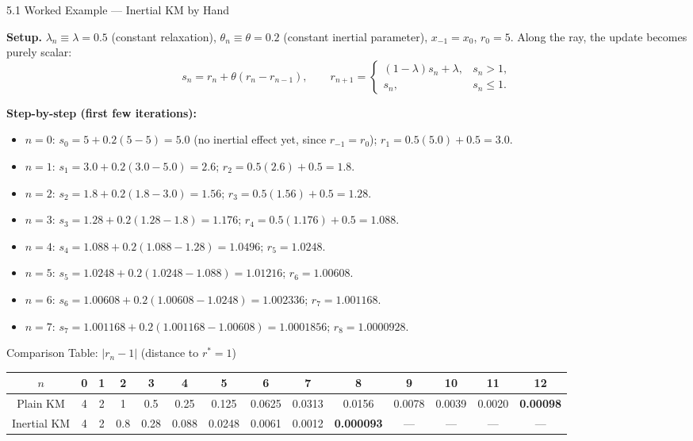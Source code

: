 \documentclass[aspectratio=169,10pt]{beamer}
\begin{document}
\begin{frame}[allowframebreaks]{5.1 Worked Example --- Inertial KM by Hand}

  \textbf{Setup.}  $\lambda_n\equiv\lambda=0.5$ (constant
  relaxation), $\theta_n\equiv\theta=0.2$ (constant inertial
  parameter), $x_{-1}=x_0$, $r_0=5$.  Along the ray, the update
  becomes purely scalar:
  \[
    s_n = r_n + \theta(r_n-r_{n-1}), \qquad
    r_{n+1} =
    \begin{cases}
      (1-\lambda)s_n+\lambda, & s_n>1,\\
      s_n, & s_n\le1.
    \end{cases}
  \]

  \textbf{Step-by-step (first few iterations):}
  \begin{itemize}
    \item $n=0$: $s_0 = 5+0.2(5-5)=5.0$ (no inertial effect yet,
          since $r_{-1}=r_0$); $r_1=0.5(5.0)+0.5=3.0$.
    \item $n=1$: $s_1=3.0+0.2(3.0-5.0)=2.6$; $r_2=0.5(2.6)+0.5=1.8$.
    \item $n=2$: $s_2=1.8+0.2(1.8-3.0)=1.56$; $r_3=0.5(1.56)+0.5=1.28$.
    \item $n=3$: $s_3=1.28+0.2(1.28-1.8)=1.176$; $r_4=0.5(1.176)+0.5=1.088$.
    \item $n=4$: $s_4=1.088+0.2(1.088-1.28)=1.0496$; $r_5=1.0248$.
    \item $n=5$: $s_5=1.0248+0.2(1.0248-1.088)=1.01216$; $r_6=1.00608$.
    \item $n=6$: $s_6=1.00608+0.2(1.00608-1.0248)=1.002336$; $r_7=1.001168$.
    \item $n=7$: $s_7=1.001168+0.2(1.001168-1.00608)=1.0001856$;
          $r_8=1.0000928$.
  \end{itemize}

  \framebreak

  \begin{block}{Comparison Table: $|r_n-1|$ (distance to $r^*=1$)}
    \centering\footnotesize
    \begin{tabular}{c|ccccccccccccc}
      \toprule
      $n$ & 0 & 1 & 2 & 3 & 4 & 5 & 6 & 7 & 8 & 9 & 10 & 11 & 12\\
      \midrule
      Plain KM & 4 & 2 & 1 & 0.5 & 0.25 & 0.125 & 0.0625 & 0.0313 &
        0.0156 & 0.0078 & 0.0039 & 0.0020 & \textbf{0.00098}\\
      Inertial KM & 4 & 2 & 0.8 & 0.28 & 0.088 & 0.0248 & 0.0061 &
        0.0012 & \textbf{0.000093} & --- & --- & --- & ---\\
      \bottomrule
    \end{tabular}
  \end{block}


\end{frame}
\end{document}
